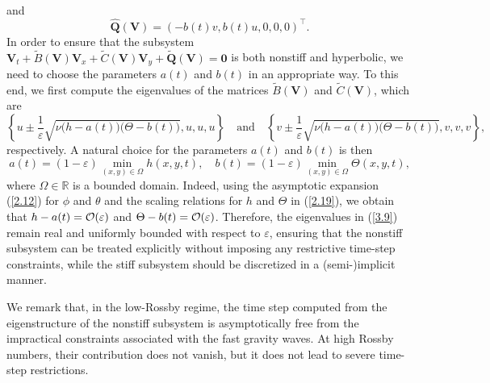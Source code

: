\documentclass[a4paper,11pt,twoside]{article}
\numberwithin{equation}{section}
\numberwithin{figure}{section}
\numberwithin{table}{section}
\newcommand{\eps}{\varepsilon}
\newcommand{\bV}{\bm{V}}
\newcommand{\bQ}{\bm{Q}}
\newcommand\eref[1]{(\ref{#1})}
\newcommand{\RIIIcolor}[1]{{\leavevmode\color{magenta} #1}}
\begin{document}
and
\begin{equation}
\widehat{\bQ}(\bV)=\left(-b(t)v,b(t)u,0,0,0\right)^\top.
\label{3.8}
\end{equation}
In order to ensure that the subsystem $\bV_t+\widetilde B(\bV)\bV_x+\widetilde C(\bV)\bV_y+\widetilde{\bQ}(\bV)=\bm0$ is both nonstiff and
hyperbolic, we need to choose the parameters $a(t)$ and $b(t)$ in an appropriate way. To this end, we first compute the eigenvalues of the
matrices $\widetilde B(\bV)$ and $\widetilde C(\bV)$, which are
\begin{equation}
\left\{u\pm\frac{1}{\eps}\sqrt{\nu\big(h-a(t)\big)\big(\Theta-b(t)\big)},u,u,u\right\}\quad\mbox{and}\quad
\left\{v\pm\frac{1}{\eps}\sqrt{\nu\big(h-a(t)\big)\big(\Theta-b(t)\big)},v,v,v\right\},
\label{3.9}
\end{equation}
respectively. A natural choice for the parameters $a(t)$ and $b(t)$ is then
\begin{equation}
a(t)=(1-\eps)\!\min_{(x,y)\in\Omega}\!h(x,y,t),\quad b(t)=(1-\eps)\!\min_{(x,y)\in\Omega}\!\Theta(x,y,t),
\label{3.10f}
\end{equation}
where $\Omega\in\mathbb R$ is a bounded domain. Indeed, using the asymptotic expansion \eref{2.12} for $\phi$ and $\theta$ and the scaling
relations for $h$ and $\Theta$ in \eref{2.19}, we obtain that $h-a(t)={\cal O}(\eps)$ and $\Theta-b(t)={\cal O}(\eps)$. Therefore, the
eigenvalues in \eref{3.9} remain real and uniformly bounded with respect to $\eps$, ensuring that the nonstiff subsystem can be treated 
explicitly without imposing any restrictive time-step constraints, while the stiff subsystem should be discretized in a (semi-)implicit
manner.  

\RIIIcolor{
\begin{remark}
	We remark that, in the low-Rossby regime, the time step computed from the eigenstructure of the nonstiff subsystem is asymptotically free from the impractical constraints associated with the fast gravity waves.
	At high Rossby numbers, their contribution does not vanish, but it does not lead to severe time-step restrictions.
\end{remark}
}

\end{document}

